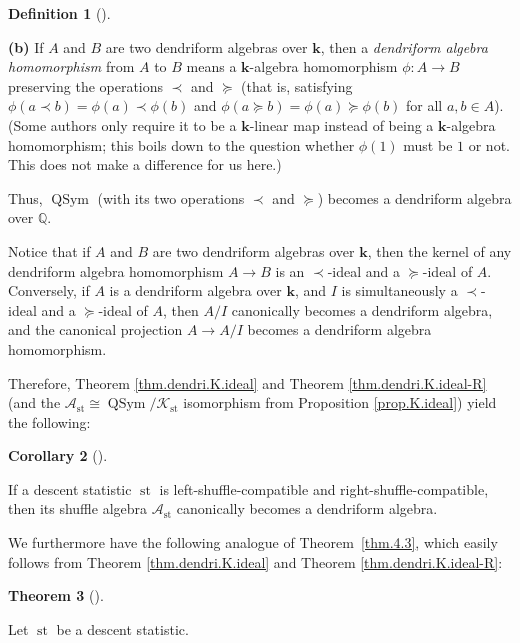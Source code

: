 \documentclass[numbers=enddot,12pt,final,onecolumn,notitlepage]{scrartcl}%
\theoremstyle{definition}
\newtheorem{theo}{Theorem}[section]
\newenvironment{theorem}[1][]
{\begin{theo}[#1]\begin{leftbar}}
{\end{leftbar}\end{theo}}
\newtheorem{defi}[theo]{Definition}
\newenvironment{definition}[1][]
{\begin{defi}[#1]\begin{leftbar}}
{\end{leftbar}\end{defi}}
\newtheorem{coro}[theo]{Corollary}
\newenvironment{corollary}[1][]
{\begin{coro}[#1]\begin{leftbar}}
{\end{leftbar}\end{coro}}
\newenvironment{verlong}{}{}
\begin{document}
\begin{verlong}
\begin{definition}
\textbf{(b)} If $A$ and $B$ are two dendriform algebras over $\mathbf{k}$,
then a \textit{dendriform algebra homomorphism} from $A$ to $B$ means a
$\mathbf{k}$-algebra homomorphism $\phi:A\rightarrow B$ preserving the
operations $\left.  \prec\right.  $ and $\left.  \succeq\right.  $ (that is,
satisfying $\phi\left(  a\left.  \prec\right.  b\right)  =\phi\left(
a\right)  \left.  \prec\right.  \phi\left(  b\right)  $ and $\phi\left(
a\left.  \succeq\right.  b\right)  =\phi\left(  a\right)  \left.
\succeq\right.  \phi\left(  b\right)  $ for all $a,b\in A$). (Some authors
only require it to be a $\mathbf{k}$-linear map instead of being a
$\mathbf{k}$-algebra homomorphism; this boils down to the question whether
$\phi\left(  1\right)  $ must be $1$ or not. This does not make a difference
for us here.)
\end{definition}

Thus, $\operatorname*{QSym}$ (with its two operations $\left.  \prec\right.  $
and $\left.  \succeq\right.  $) becomes a dendriform algebra over $\mathbb{Q}$.

Notice that if $A$ and $B$ are two dendriform algebras over $\mathbf{k}$, then
the kernel of any dendriform algebra homomorphism $A\rightarrow B$ is an
$\left.  \prec\right.  $-ideal and a $\left.  \succeq\right.  $-ideal of $A$.
Conversely, if $A$ is a dendriform algebra over $\mathbf{k}$, and $I$ is
simultaneously a $\left.  \prec\right.  $-ideal and a $\left.  \succeq
\right.  $-ideal of $A$, then $A/I$ canonically becomes a dendriform algebra,
and the canonical projection $A\rightarrow A/I$ becomes a dendriform algebra homomorphism.

Therefore, Theorem \ref{thm.dendri.K.ideal} and Theorem
\ref{thm.dendri.K.ideal-R} (and the $\mathcal{A}_{\operatorname{st}}%
\cong\operatorname*{QSym}/\mathcal{K}_{\operatorname{st}}$ isomorphism from
Proposition \ref{prop.K.ideal}) yield the following:

\begin{corollary}
\label{cor.dendri.quotient-dendri}If a descent statistic $\operatorname{st}$
is left-shuffle-compatible and right-shuffle-compatible, then its shuffle
algebra $\mathcal{A}_{\operatorname{st}}$ canonically becomes a dendriform algebra.
\end{corollary}

We furthermore have the following analogue of Theorem~\ref{thm.4.3}, which
easily follows from Theorem \ref{thm.dendri.K.ideal} and Theorem
\ref{thm.dendri.K.ideal-R}:

\begin{theorem}
\label{thm.dendri.4.3}Let $\operatorname{st}$ be a descent statistic.


\end{theorem}
\end{verlong}
\end{document}
